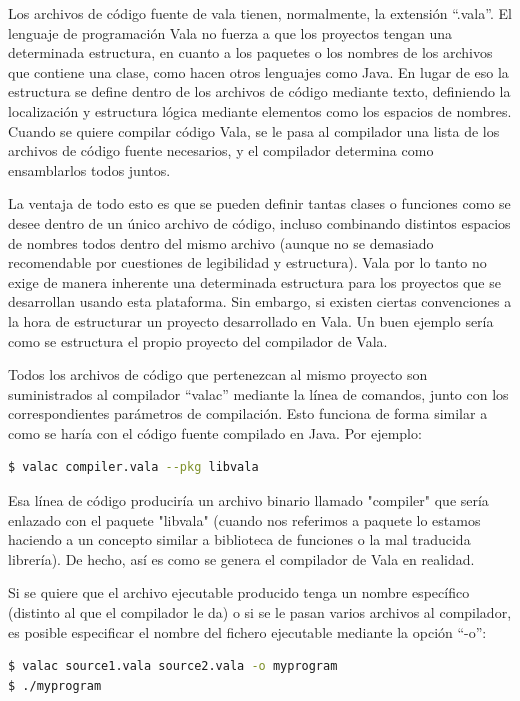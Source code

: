 \documentclass[12pt,twoside]{book}
\begin{document}
 Los archivos de código fuente de vala tienen, normalmente, la extensión ``.vala''. El lenguaje de programación Vala no fuerza a que los proyectos tengan una determinada estructura, en cuanto a los paquetes o los nombres de los archivos que contiene una clase, como hacen otros lenguajes como Java. En lugar de eso la estructura se define dentro de los archivos de código mediante texto, definiendo la localización y estructura lógica mediante elementos como los espacios de nombres. Cuando se quiere compilar código Vala, se le pasa al compilador una lista de los archivos de código fuente necesarios, y el compilador determina como ensamblarlos todos juntos.
 
 La ventaja de todo esto es que se pueden definir tantas clases o funciones como se desee dentro de un único archivo de código, incluso combinando distintos espacios de nombres todos dentro del mismo archivo (aunque no se demasiado recomendable por cuestiones de legibilidad y estructura). Vala por lo tanto no exige de manera inherente una determinada estructura para los proyectos que se desarrollan usando esta plataforma. Sin embargo, si existen ciertas convenciones a la hora de estructurar un proyecto desarrollado en Vala. Un buen ejemplo sería como se estructura el propio proyecto del compilador de Vala.
 
 Todos los archivos de código que pertenezcan al mismo proyecto son suministrados al compilador ``valac'' mediante la línea de comandos, junto con los correspondientes parámetros de compilación. Esto funciona de forma similar a como se haría con el código fuente compilado en Java. Por ejemplo:

\begin{lstlisting}[language=bash]
$ valac compiler.vala --pkg libvala
\end{lstlisting} 

Esa línea de código produciría un archivo binario llamado "compiler" que sería enlazado con el paquete "libvala" (cuando nos referimos a paquete lo estamos haciendo a un concepto similar a biblioteca de funciones o la mal traducida librería). De hecho, así es como se genera el compilador de Vala en realidad.

Si se quiere que el archivo ejecutable producido tenga un nombre específico (distinto al que el compilador le da) o si se le pasan varios archivos al compilador, es posible especificar el nombre del fichero ejecutable mediante la opción ``-o'':

\begin{lstlisting}[language=bash]
$ valac source1.vala source2.vala -o myprogram
$ ./myprogram
\end{lstlisting}
\end{document}

